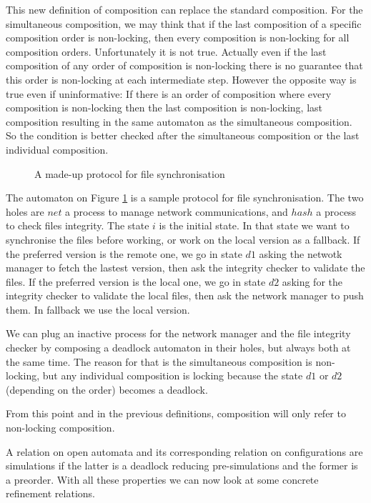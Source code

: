 \documentclass{article}
\begin{document}
This new definition of composition can replace the standard composition.
For the simultaneous composition, we may think that if the last composition of a specific composition order is non-locking, then every composition is non-locking for all composition orders.
Unfortunately it is not true.
Actually even if the last composition of any order of composition is non-locking there is no guarantee that this order is non-locking at each intermediate step.
However the opposite way is true even if uninformative:
If there is an order of composition where every composition is non-locking then the last composition is non-locking, last composition resulting in the same automaton as the simultaneous composition.
So the condition is better checked after the simultaneous composition or the last individual composition.
\begin{exi}
\begin{figure}
\centering

\caption{A made-up protocol for file synchronisation}
\label{fig:pnls}
\end{figure}
The automaton on Figure \ref{fig:pnls} is a sample protocol for file synchronisation.
The two holes are \(net\) a process to manage network communications, and \(hash\) a process to check files integrity.
The state \(i\) is the initial state.
In that state we want to synchronise the files before working, or work on the local version as a fallback.
If the preferred version is the remote one, we go in state \(d1\) asking the netwotk manager to fetch the lastest version, then ask the integrity checker to validate the files.
If the preferred version is the local one, we go in state \(d2\) asking for the integrity checker to validate the local files, then ask the network manager to push them.
In fallback we use the local version.

We can plug an inactive process for the network manager and the file integrity checker by composing a deadlock automaton in their holes, but always both at the same time.
The reason for that is the simultaneous composition is non-locking, but any individual composition is locking because the state \(d1\) or \(d2\) (depending on the order) becomes a deadlock.
\end{exi}
From this point and in the previous definitions, composition will only refer to non-locking composition.

A relation on open automata and its corresponding relation on configurations are simulations if the latter is a deadlock reducing pre-simulations and the former is a preorder.
With all these properties we can now look at some concrete refinement relations.
\end{document}
